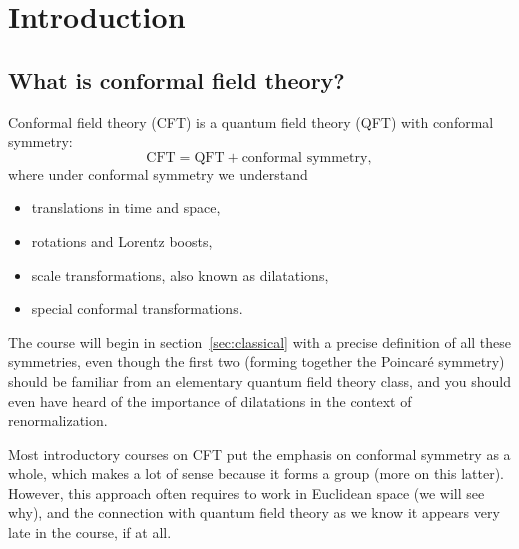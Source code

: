 \documentclass[a4paper,12pt]{article}
\numberwithin{equation}{section}
\begin{document}

\newpage
\section{Introduction}


\subsection{What is conformal field theory?}

Conformal field theory (CFT) is a quantum field theory (QFT) with conformal symmetry:
\begin{equation}
	\text{CFT}
	= \text{QFT} + \text{conformal symmetry},
\end{equation}
where under conformal symmetry we understand
\begin{itemize}

\item
translations in time and space,

\item
rotations and Lorentz boosts,

\item
scale transformations, also known as dilatations,

\item
special conformal transformations.

\end{itemize}
The course will begin in section~\ref{sec:classical} with a precise definition of all these symmetries, even though the first two (forming together the Poincaré symmetry) should be familiar from an elementary quantum field theory class, and you should even have heard of the importance of dilatations in the context of renormalization.

Most introductory courses on CFT put the emphasis on conformal symmetry as a whole, which makes a lot of sense because it forms a group (more on this latter). However, this approach often requires to work in Euclidean space (we will see why), and the connection with quantum field theory as we know it appears very late in the course, if at all.
\end{document}
